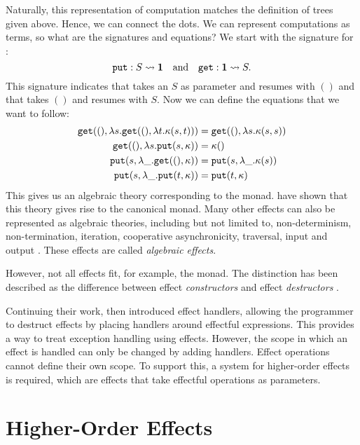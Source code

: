 Naturally, this representation of computation matches the definition of trees given above. Hence, we can connect the dots. We can represent computations as terms, so what are the signatures and equations? We start with the signature for :
\[ \mathtt{put} : S \rightsquigarrow \mathbf{1} \quad\text{and}\quad \mathtt{get} : \mathbf{1} \rightsquigarrow S. \]
This signature indicates that \oput takes an $S$ as parameter and resumes with $()$ and that \oget takes $()$ and resumes with $S$. Now we can define the equations that we want  to follow:
\begin{align*}
    \mathtt{get}((), \lambda s. \mathtt{get}((), \lambda t. \kappa(s,t))) &= \mathtt{get}((), \lambda s. \kappa(s, s)) \\
    \mathtt{get}((), \lambda s. \mathtt{put}(s, \kappa)) &= \kappa () \\
    \mathtt{put}(s, \lambda\_. \mathtt{get}((), \kappa)) &= \mathtt{put}(s, \lambda\_. \kappa(s)) \\
    \mathtt{put}(s, \lambda\_. \mathtt{put}(t, \kappa)) &= \mathtt{put}(t, \kappa)
\end{align*}
This gives us an algebraic theory corresponding to the  monad. \textcite{goos_adequacy_2001} have shown that this theory gives rise to the canonical  monad. Many other effects can also be represented as algebraic theories, including but not limited to, non-determinism, non-termination, iteration, cooperative asynchronicity, traversal, input and output \citationneeded{}. These effects are called \emph{algebraic effects}.


However, not all effects fit, for example, the  monad. The distinction has been described as the difference between effect \emph{constructors} and effect \emph{destructors} \autocite{plotkin_algebraic_2003}.


Continuing their work, \textcite{castagna_handlers_2009} then introduced effect handlers, allowing the programmer to destruct effects by placing handlers around effectful expressions. This provides a way to treat exception handling using effects. However, the scope in which an effect is handled can only be changed by adding handlers. Effect operations cannot define their own scope. To support this, a system for higher-order effects is required, which are effects that take effectful operations as parameters.

\section{Higher-Order Effects}\label{sec:elab}

